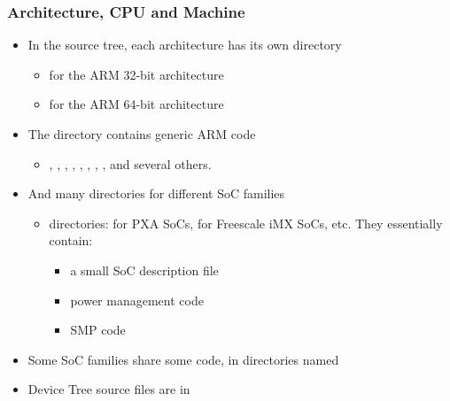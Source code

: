 \begin{frame}
  \frametitle{Architecture, CPU and Machine}
  \begin{itemize}
  \item In the source tree, each architecture has its own directory
    \begin{itemize}
    \item {} for the ARM 32-bit architecture
    \item {} for the ARM 64-bit architecture
    \end{itemize}
  \item The  directory contains generic ARM code
    \begin{itemize}
    \item {}, ,
      , ,
      , ,
      , ,
       and several others.
    \end{itemize}
  \item And many directories for different SoC families
    \begin{itemize}
    \item {} directories:  for PXA SoCs,
       for Freescale iMX SoCs, etc. They
      essentially contain:
      \begin{itemize}
      \item a small SoC description file
      \item power management code
      \item SMP code
      \end{itemize}
    \end{itemize}
  \item Some SoC families share some code, in directories named
  \item Device Tree source files are in 
  \end{itemize}
\end{frame}

